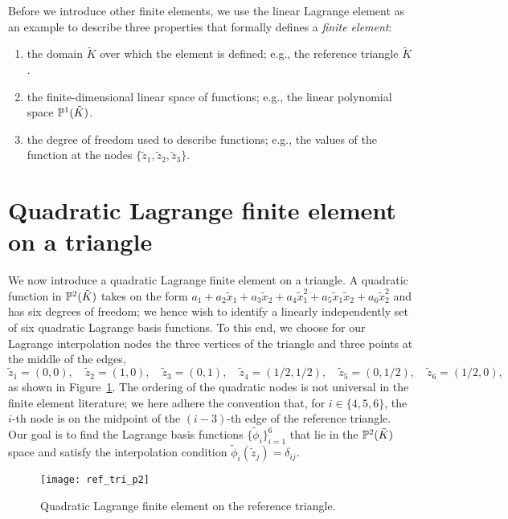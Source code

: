 Before we introduce other finite elements, we use the linear Lagrange element as an example to describe three properties that formally defines a \emph{finite element}:
\begin{enumerate}
\item the domain $\tilde K$ over which the element is defined; e.g., the reference triangle $\tilde K$.
\item the finite-dimensional linear space of functions; e.g., the linear polynomial space $\mathbb{P}^1(\tilde K)$.
\item the degree of freedom used to describe functions; e.g., the values of the function at the nodes $\{ \tilde z_1, \tilde z_2, \tilde z_3 \}$.
\end{enumerate}





\section{Quadratic Lagrange finite element on a triangle}
We now introduce a quadratic Lagrange finite element on a triangle. A quadratic function in $\mathbb{P}^2(\tilde K)$ takes on the form $a_1 + a_2 \tilde x_1 + a_3 \tilde x_2 + a_4 \tilde x_1^2 + a_5 \tilde x_1 \tilde x_2 + a_6 \tilde x_2^2$ and has six degrees of freedom; we hence wish to identify a linearly independently set of six quadratic Lagrange basis functions.  To this end, we choose for our Lagrange interpolation nodes the three vertices of the triangle and three points at the middle of the edges,
\begin{equation*}
  \tilde z_1 = (0,0), \quad \tilde z_2 = (1,0), \quad \tilde z_3 = (0,1), \quad \tilde z_4 = (1/2,1/2), \quad \tilde z_5 = (0,1/2), \quad \tilde z_6 = (1/2,0),
\end{equation*}
as shown in Figure~\ref{fig:fe_ref_tri_p2}.  The ordering of the quadratic nodes is not universal in the finite element literature; we here adhere the convention that, for $i \in \{4,5,6\}$, the $i$-th node is on the midpoint of the $(i-3)$-th edge of the reference triangle. Our goal is to find the Lagrange basis functions $\{\tilde \phi_i\}_{i=1}^6$ that lie in the $\mathbb{P}^2(\tilde K)$ space and satisfy the interpolation condition $\tilde \phi_i(\tilde z_j) = \delta_{ij}$.

\begin{figure}
  \centering
  \texttt{[image: ref\_tri\_p2]}
  \caption{Quadratic Lagrange finite element on the reference triangle.}
  \label{fig:fe_ref_tri_p2}
\end{figure}


